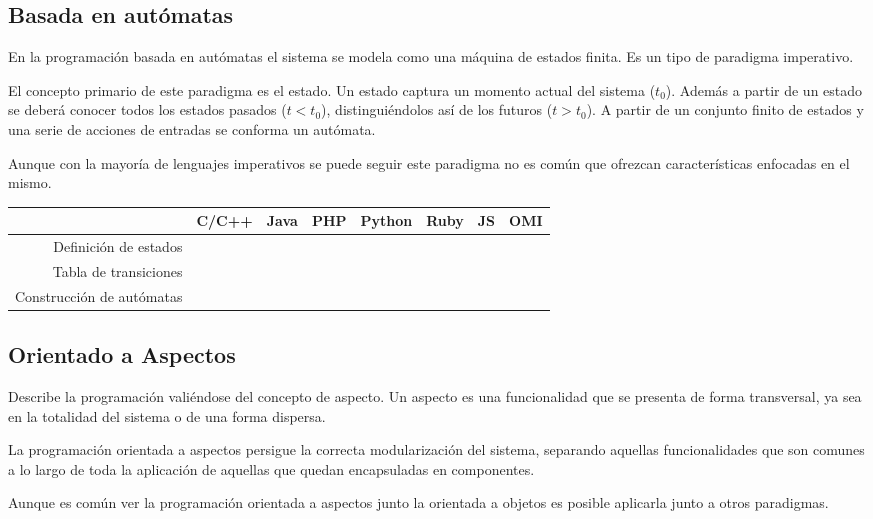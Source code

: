 \subsection{Basada en autómatas}
En la programación basada en autómatas el sistema se modela
como una máquina de estados finita. Es un tipo de paradigma imperativo.

El concepto primario de este paradigma es el estado. Un estado captura 
un momento actual del sistema ($t_0$). Además a partir de un estado se 
deberá conocer todos los estados pasados ($t < t_0$), distinguiéndolos 
así de los futuros ($ t > t_0$). A partir de un conjunto finito 
de estados y una serie de acciones de entradas se conforma un 
autómata.

Aunque con la mayoría de lenguajes imperativos se puede seguir este paradigma no es 
común que ofrezcan características enfocadas en el mismo.

\FloatBarrier
\begin{table}[h]
\begin{center}
 
\begin{tabular}{|r|c|c|c|c|c|c|c|} \hline
 & C/C++ & Java & PHP  & Python & Ruby & JS & OMI\\ \hline
Definición de estados & & & & & &  &  \\ \hline
Tabla de transiciones & & & & & &  &  \\ \hline
Construcción de autómatas & & & & & &  &  \\ \hline
\end{tabular}
\end{center}
\end{table}
\FloatBarrier

\subsection{Orientado a Aspectos}

Describe la programación valiéndose del concepto de aspecto. Un aspecto es una
funcionalidad que se presenta de forma transversal, ya sea en la totalidad 
del sistema o de una forma dispersa. 

La programación orientada a aspectos persigue la correcta modularización del sistema, separando
aquellas funcionalidades que son comunes a lo largo de toda la aplicación de aquellas
que quedan encapsuladas en componentes. 

Aunque es común ver la programación orientada a aspectos junto la orientada a objetos es posible 
aplicarla junto a otros paradigmas. 

